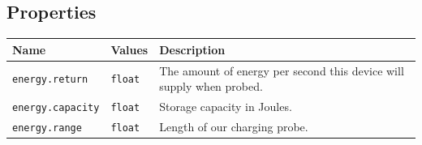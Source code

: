 \documentclass[letter,11pt,twoside]{report}
\begin{document}
\subsection*{Properties}
\begin{tabularx}{\columnwidth}{llX}
\hline Name & Values & Description \\ 
\hline 

\verb'energy.return' & \verb'float' & The amount of energy per second
this device will supply when probed. \\
\verb'energy.capacity' & \verb'float' & Storage capacity in Joules.\\
\verb'energy.range' & \verb'float' & Length of our charging probe.\\
\hline
\end{tabularx}






\end{document}
